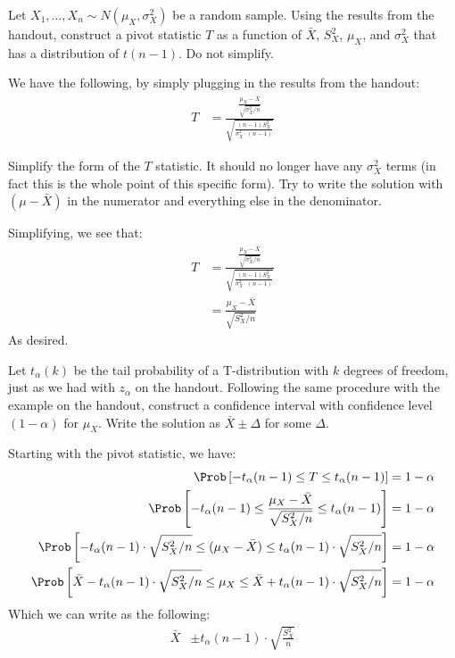 
Let $X_1, \ldots, X_n \sim N(\mu_X, \sigma_X^2)$ be a random sample. Using
the results from the handout, construct a pivot statistic $T$ as a function
of $\bar{X}$, $S_X^2$, $\mu_X$, and $\sigma_X^2$ that has a distribution of
$t(n-1)$. Do not simplify.


We have the following, by simply plugging in the results from the handout:
\begin{align*}
T &= \frac{\frac{\mu_X - \bar{X}}{\sqrt{\sigma_X^2 / n}}}{\sqrt{\frac{(n-1)S^2_X}{\sigma_X^2 \cdot (n-1)}}}
\end{align*}


Simplify the form of the $T$ statistic. It should no longer have any
$\sigma_X^2$ terms (in fact this is the whole point of this specific form). 
Try to write the solution with $(\mu - \bar{X})$ in the numerator and
everything else in the denominator.


Simplifying, we see that:
\begin{align*}
T &= \frac{\frac{\mu_X - \bar{X}}{\sqrt{\sigma_X^2 / n}}}{\sqrt{\frac{(n-1)S^2_X}{\sigma_X^2 \cdot (n-1)}}} \\
&= \frac{\mu_X - \bar{X}}{\sqrt{S^2_X / n}}
\end{align*}
As desired.


Let $t_\alpha(k)$ be the tail probability of a T-distribution with $k$
degrees of freedom, just as we had with $z_\alpha$ on the handout. Following
the same procedure with the example on the handout, construct a confidence
interval with confidence level $(1 - \alpha)$ for $\mu_X$. Write the solution
as $\bar{X} \pm \Delta$ for some $\Delta$.


Starting with the pivot statistic, we have:
\begin{align*}
\Prob\left[ -t_\alpha(n-1) \leq T \leq t_\alpha(n-1) \right] &= 1 - \alpha \\
\Prob\left[ -t_\alpha(n-1) \leq \frac{\mu_X - \bar{X}}{\sqrt{S^2_X / n}} \leq t_\alpha(n-1) \right] &= 1 - \alpha \\
\Prob\left[ -t_\alpha(n-1) \cdot \sqrt{S^2_X / n} \leq (\mu_X - \bar{X}) \leq t_\alpha(n-1) \cdot \sqrt{S^2_X / n} \right] &= 1 - \alpha \\
\Prob\left[ \bar{X} - t_\alpha(n-1) \cdot \sqrt{S^2_X / n} \leq \mu_X \leq \bar{X} + t_\alpha(n-1) \cdot \sqrt{S^2_X / n} \right] &= 1 - \alpha \\
\end{align*}
Which we can write as the following:
\begin{align*}
\bar{X} &\pm t_\alpha(n-1) \cdot \sqrt{\frac{S^2_X}{n}}
\end{align*}


